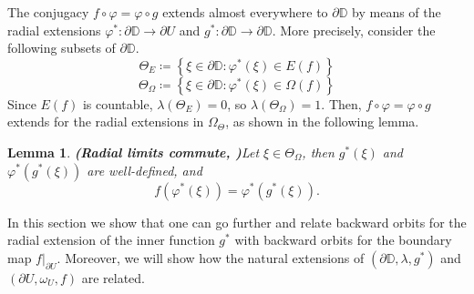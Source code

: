 \documentclass[11pt]{article}
\newtheorem{lemma}[thm]{Lemma}
\theoremstyle{definition}
\theoremstyle{remark}
\theoremstyle{plain}
\begin{document}
The conjugacy $ f\circ\varphi=\varphi\circ g $ extends almost everywhere to $ \partial \mathbb{D} $ by means of the radial extensions $ \varphi^*\colon \partial \mathbb{D}\to\partial U $ and $ g^*\colon\partial\mathbb{D}\to\partial\mathbb{D} $. 
More precisely, consider
the following subsets of $ \partial \mathbb{D} $.
\[\Theta_E\coloneqq \left\lbrace \xi\in\partial\mathbb{D}\colon \varphi^*(\xi)\in E(f) \right\rbrace  \] 
\[\Theta_\Omega\coloneqq \left\lbrace \xi\in\partial\mathbb{D}\colon \varphi^*(\xi)\in\Omega(f) \right\rbrace \] 
Since $ E(f) $ is countable, $ \lambda(\Theta_E)=0 $, so $ \lambda(\Theta_\Omega)=1 $. Then, $ f\circ \varphi=\varphi\circ g $ extends for the radial extensions in $ \Omega_\Theta $, as shown in the following lemma.
\begin{lemma}{\bf(Radial limits commute, {\normalfont \cite[Lemma 5.5]{Jove}})}\label{lemma-radial-limit}
	Let $ \xi\in\Theta_\Omega $, then $ g^*(\xi) $ and $ \varphi^*(g^*(\xi)) $ are well-defined, and \[f(\varphi^*(\xi))=\varphi^*(g^*(\xi)).\] 
\end{lemma}
In this section we show that one can go further and relate backward orbits for the radial extension of the inner function $ g^* $ with backward orbits for the boundary map $ f|_{\partial U} $. Moreover, we will show how the natural extensions of $ (\partial \mathbb{D}, \lambda, g^*) $ and $ (\partial U, \omega_U, f) $ are related. 
\end{document}
